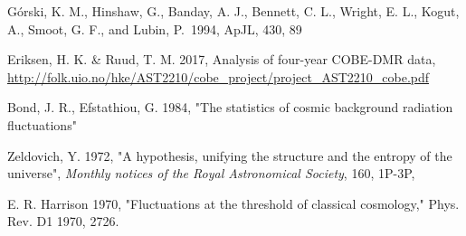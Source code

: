 \documentclass{emulateapj}
\begin{document}
\begin{thebibliography}{}

 G{\'o}rski, K. M.,
  Hinshaw, G., Banday, A. J., Bennett, C. L., Wright, E. L., Kogut,
  A., Smoot, G. F., and Lubin, P.\ 1994, ApJL, 430, 89

Eriksen, H. K. \& Ruud, T. M. 2017, Analysis of four-year COBE-DMR data, \url{http://folk.uio.no/hke/AST2210/cobe_project/project_AST2210_cobe.pdf}

Bond, J. R., Efstathiou, G. 1984,  "The statistics of cosmic background radiation ﬂuctuations"

Zeldovich, Y. 1972, "A hypothesis, unifying the structure and
the entropy of the universe", \textit{Monthly notices of the Royal Astronomical Society}, 160, 1P-3P, 

E. R. Harrison 1970,  "Fluctuations at the threshold of classical
cosmology," Phys. Rev. D1 1970, 2726.

\end{thebibliography}
\end{document}
